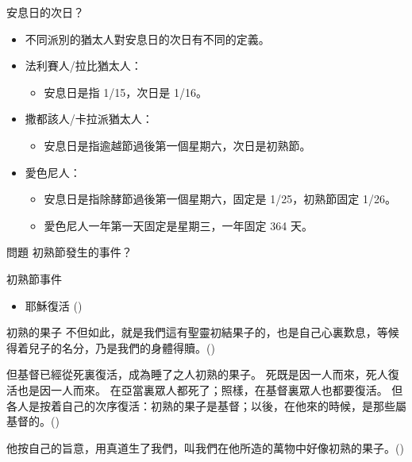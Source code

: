\documentclass{beamer}
\newcommand{\question}[1]{
\begin{frame}{問題}
    \centering
    \vspace*{1cm}
    \huge #1？\par
    \vfill
\end{frame}
}
\newcommand{\parvspace}{\par\vspace{0.5em}}
\begin{document}
\begin{frame}{安息日的次日？}
    \begin{itemize}
        \item 不同派別的猶太人對安息日的次日有不同的定義。\parencite{TruthShavuot}
        \item 法利賽人/拉比猶太人：
              \begin{itemize}
                  \item 安息日是指 1/15，次日是 1/16。
              \end{itemize}
        \item 撒都該人/卡拉派猶太人：
              \begin{itemize}
                  \item 安息日是指逾越節過後第一個星期六，次日是初熟節。
              \end{itemize}
        \item 愛色尼人：
              \begin{itemize}
                  \item 安息日是指除酵節過後第一個星期六，固定是 1/25，初熟節固定 1/26。
                  \item 愛色尼人一年第一天固定是星期三，一年固定 364 天。
              \end{itemize}
    \end{itemize}
\end{frame}

\question{初熟節發生的事件}

\begin{frame}{初熟節事件}
    \begin{itemize}
        \item 耶穌復活 ()
    \end{itemize}
\end{frame}

\begin{frame}{初熟的果子}
    不但如此，就是我們這有聖靈\alert{初結果子}的，也是自己心裏歎息，等候得着兒子的名分，乃是我們的身體得贖。()\parvspace
    但基督已經從死裏復活，成為\alert{睡了之人初熟的果子}。 死既是因一人而來，死人復活也是因一人而來。 在亞當裏眾人都死了；照樣，在基督裏眾人也都要復活。 但各人是按着自己的次序復活：\alert{初熟的果子是基督}；以後，在他來的時候，是那些屬基督的。()\parvspace
    他按自己的旨意，用真道生了我們，叫我們在他所造的萬物中好像\alert{初熟的果子}。()\parvspace
\end{frame}
\end{document}
